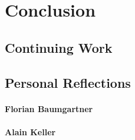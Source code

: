 \chapter{Conclusion}

\section{Continuing Work}


\newpage
\section{Personal Reflections}
\subsubsection{Florian Baumgartner}

\subsubsection{Alain Keller}
